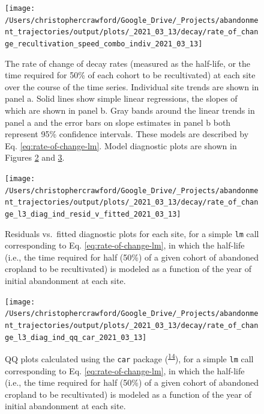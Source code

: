 \documentclass[
]{article}
\begin{document}
\begin{figure}
\texttt{[image: /Users/christophercrawford/Google\_Drive/\_Projects/abandonment\_trajectories/output/plots/\_2021\_03\_13/decay/rate\_of\_change\_recultivation\_speed\_combo\_indiv\_2021\_03\_13]} \caption{The rate of change of decay rates (measured as the half-life, or the time required for 50\% of each cohort to be recultivated) at each site over the course of the time series. Individual site trends are shown in panel a. Solid lines show simple linear regressions, the slopes of which are shown in panel b. Gray bands around the linear trends in panel a and the error bars on slope estimates in panel b both represent 95\% confidence intervals. These models are described by Eq. \eqref{eq:rate-of-change-lm}. Model diagnostic plots are shown in Figures \ref{fig:rate-of-change-diag-resid-fitted} and \ref{fig:rate-of-change-diag-qq}.}\label{fig:decay-rate-of-change}
\end{figure}



\begin{figure}
\texttt{[image: /Users/christophercrawford/Google\_Drive/\_Projects/abandonment\_trajectories/output/plots/\_2021\_03\_13/decay/rate\_of\_change\_l3\_diag\_ind\_resid\_v\_fitted\_2021\_03\_13]} \caption{Residuals vs.~fitted diagnostic plots for each site, for a simple \texttt{lm} call corresponding to Eq. \eqref{eq:rate-of-change-lm}, in which the half-life (i.e., the time required for half (50\%) of a given cohort of abandoned cropland to be recultivated) is modeled as a function of the year of initial abandonment at each site.}\label{fig:rate-of-change-diag-resid-fitted}
\end{figure}



\begin{figure}
\texttt{[image: /Users/christophercrawford/Google\_Drive/\_Projects/abandonment\_trajectories/output/plots/\_2021\_03\_13/decay/rate\_of\_change\_l3\_diag\_ind\_qq\_car\_2021\_03\_13]} \caption{QQ plots calculated using the \texttt{car} package (\textsuperscript{\protect\hyperlink{ref-R-car}{14}}), for a simple \texttt{lm} call corresponding to Eq. \eqref{eq:rate-of-change-lm}, in which the half-life (i.e., the time required for half (50\%) of a given cohort of abandoned cropland to be recultivated) is modeled as a function of the year of initial abandonment at each site.}\label{fig:rate-of-change-diag-qq}
\end{figure}
\end{document}

